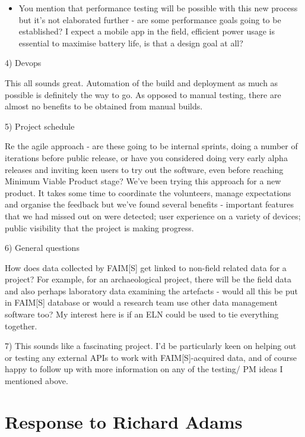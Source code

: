 \documentclass[a4paper,headings=small fontsize=10pt]{scrreprt}
\begin{document}
\begin{itemize}
\item You mention that performance testing will be possible with this new
  process but it's not elaborated further - are some performance goals
  going to be established? I expect a mobile app in the field, efficient
  power usage is essential to maximise battery life, is that a design
  goal at all?
 
\end{itemize}

4) Devops

This all sounds great. Automation of the build and deployment as much as
possible is definitely the way to go. As opposed to manual testing,
there are almost no benefits to be obtained from manual builds.

5) Project schedule

Re the agile approach - are these going to be internal sprints, doing a
number of iterations before public release, or have you considered doing
very early alpha releases and inviting keen users to try out the
software, even before reaching Minimum Viable Product stage? We've been
trying this approach for a new product. It takes some time to coordinate
the volunteers, manage expectations and organise the feedback but we've
found several benefits - important features that we had missed out on
were detected; user experience on a variety of devices; public
visibility that the project is making progress.

6) General questions

How does data collected by FAIM{[}S{]} get linked to non-field related
data for a project? For example, for an archaeological project, there
will be the field data and also perhaps laboratory data examining the
artefacts - would all this be put in FAIM{[}S{]} database or would a
research team use other data management software too? My interest here
is if an ELN could be used to tie everything together.

7) This sounds like a fascinating project. I'd be particularly keen on
helping out or testing any external APIs to work with
FAIM{[}S{]}-acquired data, and of course happy to follow up with more
information on any of the testing/ PM ideas I mentioned above.

\section{Response to Richard Adams}
\end{document}
